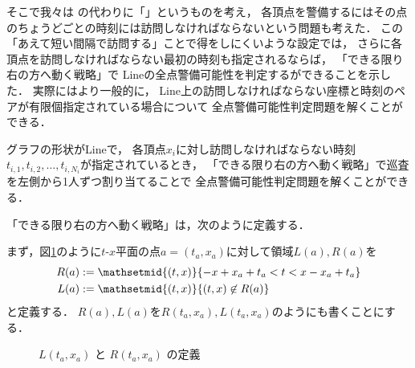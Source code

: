 そこで我々は
{\timelimit}の代わりに「{\interval}」というものを考え，
各頂点を警備するにはその点の{\interval}ちょうどごとの時刻には訪問しなければならないという問題も考えた．
この「あえて短い間隔で訪問する」ことで得をしにくいような設定では，
さらに各頂点を訪問しなければならない最初の時刻も指定されるならば，
「できる限り右の方へ動く戦略」で
Lineの全点警備可能性を判定するができることを示した．
実際にはより一般的に，
Line上の訪問しなければならない座標と時刻のペアが有限個指定されている場合について
全点警備可能性判定問題を解くことができる．



\begin{theo}
	\label{theo:LineExactFinite}
	グラフの形状がLineで，
	各頂点$x_i$に対し訪問しなければならない時刻
	$t_{i,1}, t_{i,2}, \ldots, t_{i,{N_i}}$が指定されているとき，
	「できる限り右の方へ動く戦略」で巡査を左側から1人ずつ割り当てることで
	全点警備可能性判定問題を解くことができる．
\end{theo}


「できる限り右の方へ動く戦略」は，次のように定義する．

まず，図\ref{tikz:defLR}のように$t$-$x$平面の点$a = (t_a,x_a)$に対して領域$L(a), R(a)$を
\begin{align*}
	R(a) &:= \mathsetmid{(t,x)}{ -x + x_a + t_a < t < x - x_a + t_a } \\
	L(a) &:= \mathsetmid{(t,x)}{ (t,x) \not\in R(a) }
\end{align*}
と定義する．
$R(a),L(a)$を$R(t_a,x_a),L(t_a,x_a)$のようにも書くことにする．

\begin{figure}[h]
	\centering
	\caption{$L(t_a,x_a)$ と $R(t_a,x_a)$ の定義 \label{tikz:defLR}}
\end{figure}



